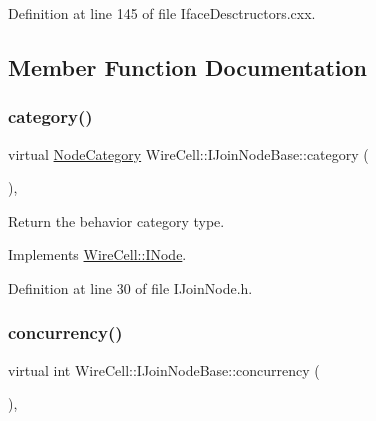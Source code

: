 Definition at line 145 of file Iface\+Desctructors.\+cxx.



\subsection{Member Function Documentation}
\mbox{\label{class_wire_cell_1_1_i_join_node_base_aa136f23e80aa3919612a3fd396b502f9}} 
\subsubsection{\texorpdfstring{category()}{category()}}
{\footnotesize\ttfamily virtual \hyperlink{class_wire_cell_1_1_i_node_a5546e64cbb70bd3ac787295cac9ac803}{Node\+Category} Wire\+Cell\+::\+I\+Join\+Node\+Base\+::category (\begin{DoxyParamCaption}{ }\end{DoxyParamCaption})\hspace{0.3cm}{\ttfamily [inline]}, {\ttfamily [virtual]}}



Return the behavior category type. 



Implements \hyperlink{class_wire_cell_1_1_i_node_a58c07f15b165e5fb33bbc7b2e047b39b}{Wire\+Cell\+::\+I\+Node}.



Definition at line 30 of file I\+Join\+Node.\+h.

\mbox{\label{class_wire_cell_1_1_i_join_node_base_a03ae350e6d99bff19fc4e01c9e3d7f6d}} 
\subsubsection{\texorpdfstring{concurrency()}{concurrency()}}
{\footnotesize\ttfamily virtual int Wire\+Cell\+::\+I\+Join\+Node\+Base\+::concurrency (\begin{DoxyParamCaption}{ }\end{DoxyParamCaption})\hspace{0.3cm}{\ttfamily [inline]}, {\ttfamily [virtual]}}



